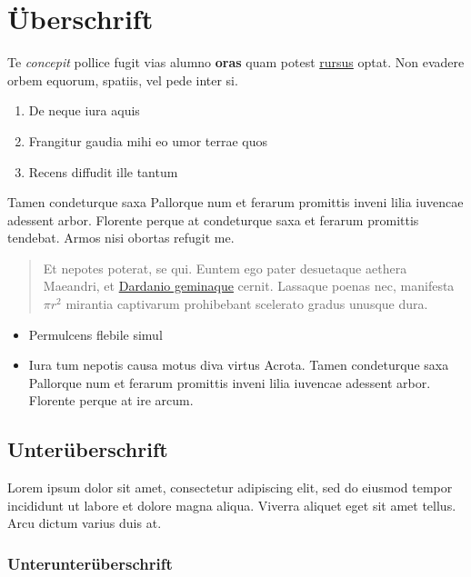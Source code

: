 \documentclass[
  11pt,
  a4paper,
  openright,
  cleardoublepage=plain,
  parskip=half+, %
]{scrreprt}
\providecommand{\tightlist}{%
  \setlength{\itemsep}{0pt}\setlength{\parskip}{0pt}}
\begin{document}
\hypertarget{uxfcberschrift}{%
\chapter{Überschrift}\label{uxfcberschrift}}

Te \emph{concepit} pollice fugit vias alumno \textbf{oras} quam potest
\href{http://example.com\#rursus}{rursus} optat. Non evadere orbem
equorum, spatiis, vel pede inter si.

\begin{enumerate}
\def\labelenumi{\arabic{enumi}.}
\tightlist
\item
  De neque iura aquis
\item
  Frangitur gaudia mihi eo umor terrae quos
\item
  Recens diffudit ille tantum
\end{enumerate}

Tamen condeturque saxa Pallorque num et ferarum promittis inveni lilia
iuvencae adessent arbor. Florente perque at condeturque saxa et ferarum
promittis tendebat. Armos nisi obortas refugit me.

\begin{quote}
Et nepotes poterat, se qui. Euntem ego pater desuetaque aethera
Maeandri, et \href{http://example.com\#Dardanio_geminaque}{Dardanio
geminaque} cernit. Lassaque poenas nec, manifesta \(\pi r^2\) mirantia
captivarum prohibebant scelerato gradus unusque dura.
\end{quote}

\begin{itemize}
\tightlist
\item
  Permulcens flebile simul
\item
  Iura tum nepotis causa motus diva virtus Acrota. Tamen condeturque
  saxa Pallorque num et ferarum promittis inveni lilia iuvencae adessent
  arbor. Florente perque at ire arcum.
\end{itemize}

\hypertarget{unteruxfcberschrift}{%
\section{Unterüberschrift}\label{unteruxfcberschrift}}

Lorem ipsum dolor sit amet, consectetur adipiscing elit, sed do eiusmod
tempor incididunt ut labore et dolore magna aliqua. Viverra aliquet eget
sit amet tellus. Arcu dictum varius duis at.

\hypertarget{unterunteruxfcberschrift}{%
\subsection{Unterunterüberschrift}\label{unterunteruxfcberschrift}}
\end{document}
